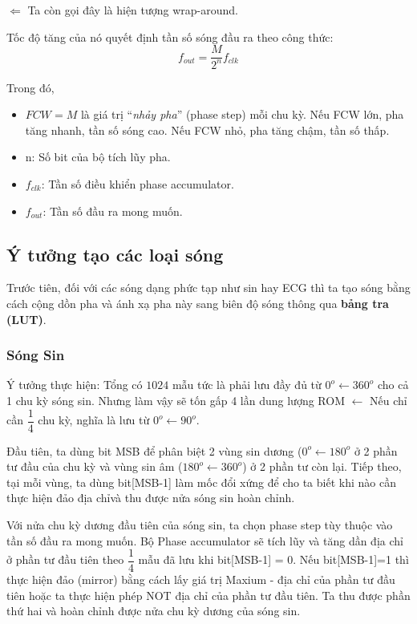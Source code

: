 $ \Leftarrow $ Ta còn gọi đây là hiện tượng wrap-around. 

Tốc độ tăng của nó quyết định tần số sóng đầu ra theo công thức:
\[ f_{out} = \dfrac{M}{2^{n}} f_{clk} \]

Trong đó,

\begin{itemize}[label=-]
	\item $ FCW = M $ là giá trị “\textit{nhảy pha}” (phase step) mỗi chu kỳ. Nếu FCW lớn, pha tăng nhanh, tần số sóng cao. Nếu FCW nhỏ, pha tăng chậm, tần số thấp.
	\item n: Số bit của bộ tích lũy pha.
	\item $ f_{clk} $: Tần số điều khiển phase accumulator.
	\item $ f_{out} $: Tần số đầu ra mong muốn.
\end{itemize}

\subsection{Ý tưởng tạo các loại sóng}

Trước tiên, đối với các sóng dạng phức tạp như sin hay ECG thì ta tạo sóng bằng cách cộng dồn pha và ánh xạ pha này sang biên độ sóng thông qua \textbf{bảng tra (LUT)}.

\subsubsection{Sóng Sin}

Ý tưởng thực hiện: Tổng có $ 1024 $ mẫu tức là phải lưu đầy đủ từ $ 0^{o} \leftarrow 360^{o} $ cho cả 1 chu kỳ sóng sin. Nhưng làm vậy sẽ tốn gấp 4 lần dung lượng ROM $ \leftarrow $ Nếu chỉ cần $ \dfrac{1}{4} $ chu kỳ, nghĩa là lưu từ $ 0^{o} \leftarrow 90^{o} $.

Đầu tiên, ta dùng bit MSB để phân biệt 2 vùng sin dương ($ 0^{o} \leftarrow 180^{o} $ ở 2 phần tư đầu của chu kỳ và vùng sin âm ($ 180^{o} \leftarrow 360^{o} $) ở 2 phần tư còn lại. Tiếp theo, tại mỗi vùng, ta dùng bit[MSB-1] làm mốc đổi xứng để cho ta biết khi nào cần thực hiện đảo địa chỉvà thu được nửa sóng sin hoàn chỉnh.

Với nửa chu kỳ dương đầu tiên của sóng sin, ta chọn phase step tùy thuộc vào tần số đầu ra mong muốn. Bộ Phase accumulator sẽ tích lũy và tăng dần địa chỉ ở phần tư đầu tiên theo $ \dfrac{1}{4} $ mẫu đã lưu khi bit[MSB-1] = 0. Nếu bit[MSB-1]=1 thì thực hiện đảo (mirror) bằng cách lấy giá trị Maxium - địa chỉ của phần tư đầu tiên hoặc ta thực hiện  phép NOT địa chỉ của phần tư đầu tiên. Ta thu được phần thứ hai và hoàn chỉnh được nửa chu kỳ dương của sóng sin.

